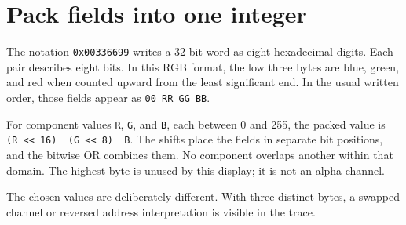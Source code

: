 \section{Pack fields into one
  integer}\label{002-single-pixel-p03-pack-fields-into-one-integer}

The notation \texttt{0x00336699} writes a 32-bit word as eight
hexadecimal digits. Each pair describes eight bits. In this RGB format,
the low three bytes are blue, green, and red when counted upward from
the least significant end. In the usual written order, those fields
appear as \texttt{00\ RR\ GG\ BB}.

For component values \texttt{R}, \texttt{G}, and \texttt{B}, each
between 0 and 255, the packed value is
\texttt{(R\ \textless{}\textless{}\ 16)\ \textbar{}\ (G\ \textless{}\textless{}\ 8)\ \textbar{}\ B}.
The shifts place the fields in separate bit positions, and the bitwise
OR combines them. No component overlaps another within that domain. The
highest byte is unused by this display; it is not an alpha channel.

The chosen values are deliberately different. With three distinct bytes,
a swapped channel or reversed address interpretation is visible in the
trace.
